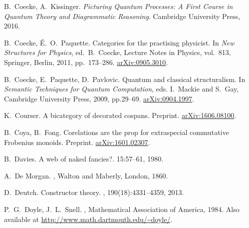 \begin{thebibliography}{RSW00}
    
    
    B.\ Coecke, A.\ Kissinger.
    \newblock \textsl{Picturing Quantum Processes: A First Course in Quantum Theory and Diagrammatic Reasoning}.
    \newblock Cambridge University Press, 2016.

    B.\ Coecke, \'E.\ O.\ Paquette.
    \newblock Categories for the practising physicist.
    \newblock In {\sl New Structures for Physics}, ed.\ B.\ Coecke,  
    Lecture Notes in Physics, vol.\ 813, Springer, Berlin, 2011, pp.\ 173--286.
    \newblock \href{http://arxiv.org/abs/0905.3010}{arXiv:0905.3010}.

    B.\ Coecke, E.\ Paquette, D.\ Pavlovic.
    \newblock Quantum and classical structuralism.
    \newblock In \textsl{Semantic Techniques for Quantum
    Computation}, eds. I.\ Mackie and S.\ Gay, Cambridge University Press, 2009,
    pp.29--69.
    \newblock \href{http://arxiv.org/abs/0904.1997}{arXiv:0904.1997}.

    K.\ Courser.
    \newblock A bicategory of decorated cospans.
    \newblock Preprint. 
    \newblock \href{http://arxiv.org/abs/1606.08100}{arXiv:1606.08100}.

    B.\ Coya, B.\ Fong.
    \newblock Corelations are the prop for extraspecial commutative Frobenius
    monoids.
    \newblock Preprint.
    \newblock \href{http://arxiv.org/abs/1601.02307}{arXiv:1601.02307}.

    B.\ Davies.
    \newblock A web of naked fancies?.
     { 15}:57--61, 1980.
    
    A.\ De Morgan.
    , Walton and Maberly,
    London, 1860.

    D.\ Deutch.
    \newblock Constructor theory.
    , 190(18):4331--4359, 2013.
    


    P.\ G.\ Doyle, J.\ L.\ Snell.
    , Mathematical Association of America, 1984.
    \newblock Also available at \href{http://www.math.dartmouth.edu/~doyle/}
    {http://www.math.dartmouth.edu/\~{}doyle/}.


\end{thebibliography}
